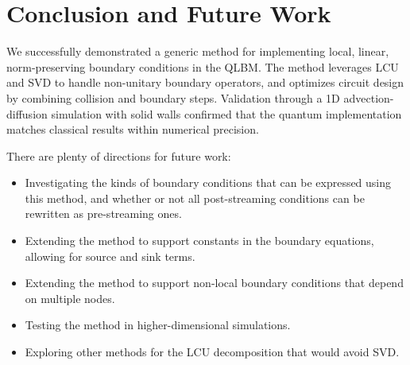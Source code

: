 \documentclass[preprint,12pt,authoryear]{elsarticle}
\begin{document}
\section{Conclusion and Future Work}
\label{sec:concl}
We successfully demonstrated a generic method for implementing local, linear, norm-preserving boundary conditions in the QLBM.
The method leverages LCU and SVD to handle non-unitary boundary operators, and optimizes circuit design by combining collision and boundary steps.
Validation through a 1D advection-diffusion simulation with solid walls confirmed that the quantum implementation matches classical results within numerical precision.

There are plenty of directions for future work:
\begin{itemize}
    \item Investigating the kinds of boundary conditions that can be expressed using this method, and whether or not all post-streaming conditions can be rewritten as pre-streaming ones.
    \item Extending the method to support constants in the boundary equations, allowing for source and sink terms.
    \item Extending the method to support non-local boundary conditions that depend on multiple nodes.
    \item Testing the method in higher-dimensional simulations.
    \item Exploring other methods for the LCU decomposition that would avoid SVD.
\end{itemize}

 

\end{document}
